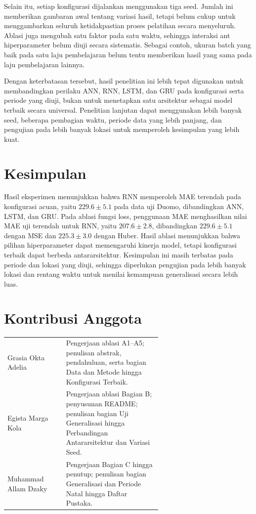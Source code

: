 \documentclass[conference,a4paper]{IEEEtran}
\begin{document}
Selain itu, setiap konfigurasi dijalankan menggunakan tiga
seed. Jumlah ini memberikan gambaran awal tentang variasi
hasil, tetapi belum cukup untuk menggambarkan seluruh
ketidakpastian proses pelatihan secara menyeluruh. Ablasi
juga mengubah satu faktor pada satu waktu, sehingga
interaksi ant hiperparameter belum diuji secara sistematis.
Sebagai contoh, ukuran batch yang baik pada satu laju
pembelajaran belum tentu memberikan hasil yang sama pada
laju pembelajaran lainnya.

Dengan keterbatasan tersebut, hasil penelitian ini lebih
tepat digunakan untuk membandingkan perilaku ANN, RNN,
LSTM, dan GRU pada konfigurasi serta periode yang diuji,
bukan untuk menetapkan satu arsitektur sebagai model terbaik
secara universal. Penelitian lanjutan dapat menggunakan
lebih banyak seed, beberapa pembagian waktu, periode data
yang lebih panjang, dan pengujian pada lebih banyak lokasi
untuk memperoleh kesimpulan yang lebih kuat.
\section{Kesimpulan}
Hasil eksperimen menunjukkan bahwa RNN memperoleh MAE terendah pada konfigurasi acuan, yaitu $229.6 \pm 5.1$ pada data uji Duomo, dibandingkan ANN, LSTM, dan GRU. Pada ablasi fungsi loss, penggunaan MAE menghasilkan nilai MAE uji terendah untuk RNN, yaitu $207.6 \pm 2.8$, dibandingkan $229.6 \pm 5.1$ dengan MSE dan $225.3 \pm 3.0$ dengan Huber. Hasil ablasi menunjukkan bahwa pilihan hiperparameter dapat memengaruhi kinerja model, tetapi konfigurasi terbaik dapat berbeda antararsitektur. Kesimpulan ini masih terbatas pada periode dan lokasi yang diuji, sehingga diperlukan pengujian pada lebih banyak lokasi dan rentang waktu untuk menilai kemampuan generalisasi secara lebih luas.

\section*{Kontribusi Anggota}
\begin{tabular}{@{}lp{0.62\linewidth}@{}}
  Grasia Okta Adelia & Pengerjaan ablasi A1--A5; penulisan abstrak, pendahuluan, serta bagian Data dan Metode hingga Konfigurasi Terbaik. \\
  Egista Marga Kola & Pengerjaan ablasi Bagian B; penyusunan README; penulisan bagian Uji Generalisasi hingga Perbandingan Antararsitektur dan Variasi Seed. \\
  Muhammad Allam Dzaky & Pengerjaan Bagian C hingga penutup; penulisan bagian Generalisasi dan Periode Natal hingga Daftar Pustaka. \\
\end{tabular}
\end{document}
